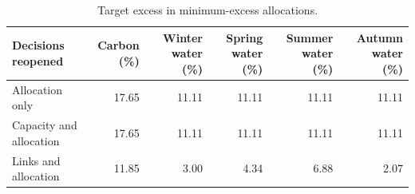 \begin{table}[H]
\centering\small
\caption{Target excess in minimum-excess allocations.}\label{tab:handoff-diagnostics}
\begin{tabular}{@{}lrrrrr@{}}
\toprule
Decisions reopened & \makecell{Carbon\\(\%)} & \makecell{Winter water\\(\%)} & \makecell{Spring water\\(\%)} & \makecell{Summer water\\(\%)} & \makecell{Autumn water\\(\%)} \\
\midrule
Allocation only & 17.65 & 11.11 & 11.11 & 11.11 & 11.11 \\
Capacity and allocation & 17.65 & 11.11 & 11.11 & 11.11 & 11.11 \\
Links and allocation & 11.85 & 3.00 & 4.34 & 6.88 & 2.07 \\
\bottomrule
\end{tabular}
\end{table}
